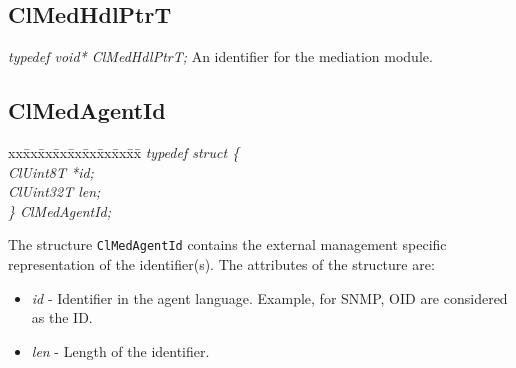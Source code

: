 \begin{flushleft}
\subsection{ClMedHdlPtrT}
\textit{typedef void* ClMedHdlPtrT;}
\newline
\newline
An identifier for the mediation module.


\subsection{ClMedAgentId}
\begin{tabbing}
xx\=xx\=xx\=xx\=xx\=xx\=xx\=xx\=xx\=\kill
\textit{typedef struct \{}\\
\>\>\>\>\textit{ClUint8T *id;}\\
\>\>\>\>\textit{ClUint32T len;}\\
\textit{\} ClMedAgentId;}\end{tabbing}
The structure {\tt{ClMedAgentId}} contains the external management specific representation of the identifier(s). The attributes of the structure are:
\begin{itemize}
\item
\textit{id} - Identifier in the agent language. Example, for SNMP, OID are considered as the ID.
\item
\textit{len} - Length of the identifier.
\end{itemize}




\end{flushleft}

